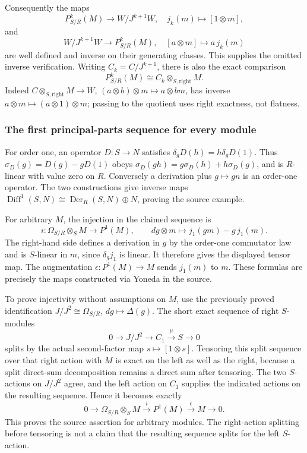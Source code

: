Consequently the maps \[
P^k_{S/R}(M)\longrightarrow W/J^{k+1}W,\quad j_k(m)\longmapsto[1\otimes m],
\] and \[
W/J^{k+1}W\longrightarrow P^k_{S/R}(M),\quad[a\otimes m]\longmapsto a\,j_k(m)
\] are well defined and inverse on their generating classes. This supplies the omitted inverse verification. Writing \(C_k=C/J^{k+1}\), there is also the exact comparison \[
P^k_{S/R}(M)\cong C_k\otimes_{S,\mathrm{right}}M.
\] Indeed \(C\otimes_{S,\mathrm{right}}M\to W\), \((a\otimes b)\otimes m\mapsto a\otimes bm\), has inverse \(a\otimes m\mapsto(a\otimes1)\otimes m\); passing to the quotient uses right exactness, not flatness.

\subsubsection{The first principal-parts sequence for every module}\label{algebra-proof-043-the-first-principal-parts-sequence-for-every-module}

For order one, an operator \(D:S\to N\) satisfies \(\delta_gD(h)=h\delta_gD(1)\). Thus \(\sigma_D(g)=D(g)-gD(1)\) obeys \(\sigma_D(gh)=g\sigma_D(h)+h\sigma_D(g)\), and is \(R\)-linear with value zero on \(R\). Conversely a derivation plus \(g\mapsto gn\) is an order-one operator. The two constructions give inverse maps \(\operatorname{Diff}^1(S,N)\cong\operatorname{Der}_R(S,N)\oplus N\), proving the source example.

For arbitrary \(M\), the injection in the claimed sequence is \[
i:\Omega_{S/R}\otimes_SM\longrightarrow P^1(M),\qquad
dg\otimes m\longmapsto j_1(gm)-g\,j_1(m).
\] The right-hand side defines a derivation in \(g\) by the order-one commutator law and is \(S\)-linear in \(m\), since \(\delta_gj_1\) is linear. It therefore gives the displayed tensor map. The augmentation \(\epsilon:P^1(M)\to M\) sends \(j_1(m)\) to \(m\). These formulas are precisely the maps constructed via Yoneda in the source.

To prove injectivity without assumptions on \(M\), use the previously proved identification \(J/J^2\cong\Omega_{S/R}\), \(dg\mapsto\Delta(g)\). The short exact sequence of right \(S\)-modules \[
0\longrightarrow J/J^2\longrightarrow C_1\xrightarrow\mu S\longrightarrow0
\] splits by the actual second-factor map \(s\mapsto[1\otimes s]\). Tensoring this split sequence over that right action with \(M\) is exact on the left as well as the right, because a split direct-sum decomposition remains a direct sum after tensoring. The two \(S\)-actions on \(J/J^2\) agree, and the left action on \(C_1\) supplies the indicated actions on the resulting sequence. Hence it becomes exactly \[
0\longrightarrow\Omega_{S/R}\otimes_SM\xrightarrow{i}P^1(M)\xrightarrow{\epsilon}M\longrightarrow0.
\] This proves the source assertion for arbitrary modules. The right-action splitting before tensoring is not a claim that the resulting sequence splits for the left \(S\)-action.

